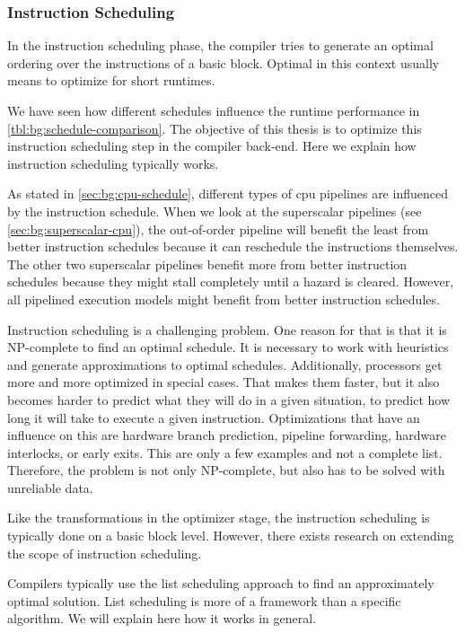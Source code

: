 \subsubsection{Instruction Scheduling}
In the instruction scheduling phase, the compiler tries to generate an optimal ordering over the instructions of a basic block.
Optimal in this context usually means to optimize for short runtimes.

We have seen how different schedules influence the runtime performance in \cref{tbl:bg:schedule-comparison}.
The objective of this thesis is to optimize this instruction scheduling step in the compiler back-end.
Here we explain how instruction scheduling typically works.

As stated in \cref{sec:bg:cpu-schedule}, different types of \ac{cpu} pipelines are influenced by the instruction schedule.
When we look at the superscalar pipelines (see \cref{sec:bg:superscalar-cpu}), the out-of-order pipeline will benefit the least from better instruction schedules because it can reschedule the instructions themselves.
The other two superscalar pipelines benefit more from better instruction schedules because they might stall completely until a hazard is cleared.
However, all pipelined execution models might benefit from better instruction schedules.

Instruction scheduling is a challenging problem.
One reason for that is that it is NP-complete to find an optimal schedule.
It is necessary to work with heuristics and generate approximations to optimal schedules.
Additionally, processors get more and more optimized in special cases.
That makes them faster, but it also becomes harder to predict what they will do in a given situation, \ie to predict how long it will take to execute a given instruction.
Optimizations that have an influence on this are hardware branch prediction, pipeline forwarding, hardware interlocks, or early exits.
This are only a few examples and not a complete list.
Therefore, the problem is not only NP-complete, but also has to be solved with unreliable data.

Like the transformations in the optimizer stage, the instruction scheduling is typically done on a basic block level.
However, there exists research on extending the scope of instruction scheduling.

Compilers typically use the list scheduling approach to find an approximately optimal solution.
List scheduling is more of a framework than a specific algorithm.
We will explain here how it works in general.

